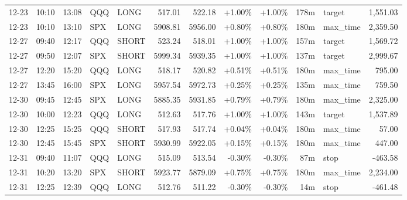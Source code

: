 \documentclass[11pt,a4paper,twoside]{article}
\begin{document}
\begin{center}
\begin{longtable}{>{\color{txtmain}}l l l l l r r r r r >{\color{txtmain}}l r}
12-23 & 10:10 & 13:08 & QQQ & LONG & 517.01 & 522.18 & \textcolor{wingreen}{+1.00\%} & \textcolor{wingreen}{+1.00\%} & 178m & target & \textcolor{wingreen}{1,551.03} \\
12-23 & 10:10 & 13:10 & SPX & LONG & 5908.81 & 5956.00 & \textcolor{wingreen}{+0.80\%} & \textcolor{wingreen}{+0.80\%} & 180m & max\_time & \textcolor{wingreen}{2,359.50} \\
12-27 & 09:40 & 12:17 & QQQ & SHORT & 523.24 & 518.01 & \textcolor{wingreen}{+1.00\%} & \textcolor{wingreen}{+1.00\%} & 157m & target & \textcolor{wingreen}{1,569.72} \\
12-27 & 09:50 & 12:07 & SPX & SHORT & 5999.34 & 5939.35 & \textcolor{wingreen}{+1.00\%} & \textcolor{wingreen}{+1.00\%} & 137m & target & \textcolor{wingreen}{2,999.67} \\
12-27 & 12:20 & 15:20 & QQQ & LONG & 518.17 & 520.82 & \textcolor{wingreen}{+0.51\%} & \textcolor{wingreen}{+0.51\%} & 180m & max\_time & \textcolor{wingreen}{795.00} \\
12-27 & 13:45 & 16:00 & SPX & LONG & 5957.54 & 5972.73 & \textcolor{wingreen}{+0.25\%} & \textcolor{wingreen}{+0.25\%} & 135m & max\_time & \textcolor{wingreen}{759.50} \\
12-30 & 09:45 & 12:45 & SPX & LONG & 5885.35 & 5931.85 & \textcolor{wingreen}{+0.79\%} & \textcolor{wingreen}{+0.79\%} & 180m & max\_time & \textcolor{wingreen}{2,325.00} \\
12-30 & 10:00 & 12:23 & QQQ & LONG & 512.63 & 517.76 & \textcolor{wingreen}{+1.00\%} & \textcolor{wingreen}{+1.00\%} & 143m & target & \textcolor{wingreen}{1,537.89} \\
12-30 & 12:25 & 15:25 & QQQ & SHORT & 517.93 & 517.74 & \textcolor{wingreen}{+0.04\%} & \textcolor{wingreen}{+0.04\%} & 180m & max\_time & \textcolor{wingreen}{57.00} \\
12-30 & 12:45 & 15:45 & SPX & SHORT & 5930.99 & 5922.05 & \textcolor{wingreen}{+0.15\%} & \textcolor{wingreen}{+0.15\%} & 180m & max\_time & \textcolor{wingreen}{447.00} \\
12-31 & 09:40 & 11:07 & QQQ & LONG & 515.09 & 513.54 & \textcolor{lossred}{-0.30\%} & \textcolor{lossred}{-0.30\%} & 87m & stop & \textcolor{lossred}{-463.58} \\
12-31 & 10:20 & 13:20 & SPX & SHORT & 5923.77 & 5879.09 & \textcolor{wingreen}{+0.75\%} & \textcolor{wingreen}{+0.75\%} & 180m & max\_time & \textcolor{wingreen}{2,234.00} \\
12-31 & 12:25 & 12:39 & QQQ & LONG & 512.76 & 511.22 & \textcolor{lossred}{-0.30\%} & \textcolor{lossred}{-0.30\%} & 14m & stop & \textcolor{lossred}{-461.48} \\

\end{longtable}
\end{center}
\end{document}
